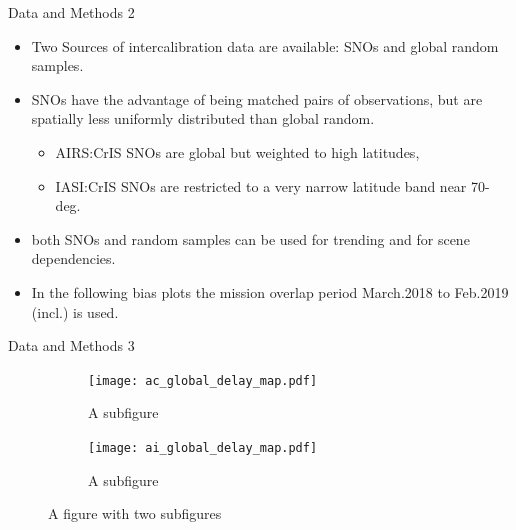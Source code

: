 \documentclass[10pt,t]{beamer}
\begin{document}
\begin{frame}{Data and Methods 2}

  \begin{itemize}
  \item Two Sources of intercalibration data are available: SNOs and global random samples.
  \item SNOs have the advantage of being matched pairs of observations, but are spatially less uniformly distributed than global random.
    \begin{itemize}
    \item AIRS:CrIS SNOs are global but weighted to high latitudes,
    \item IASI:CrIS SNOs are restricted to a very narrow latitude band near 70-deg.
    \end{itemize}
  \item both SNOs and random samples can be used for trending and for scene dependencies.
  \item In the following bias plots the mission overlap period March.2018 to Feb.2019 (incl.) is used.
    
  \end{itemize}

\end{frame}

\begin{frame}{Data and Methods 3}
  
\begin{figure}
\centering
\begin{subfigure}{.5\textwidth}
  \centering
  \texttt{[image: ac\_global\_delay\_map.pdf]}
  \caption{A subfigure}
  \label{fig:sub1}
\end{subfigure}%
\begin{subfigure}{.5\textwidth}
  \centering
  \texttt{[image: ai\_global\_delay\_map.pdf]}
  \caption{A subfigure}
  \label{fig:sub2}
\end{subfigure}
\caption{A figure with two subfigures}
\label{fig:test}
\end{figure}

\end{frame}
\end{document}
